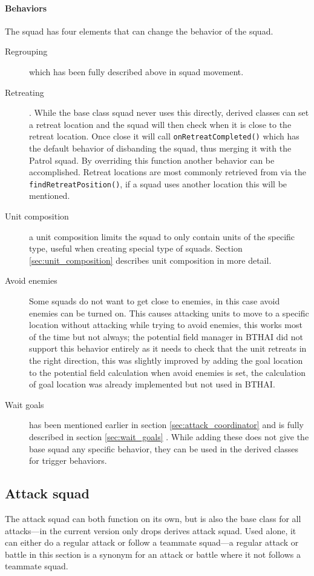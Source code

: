 \paragraph{Behaviors}
The squad has four elements that can change the behavior of the squad.
\begin{description}
	\item[Regrouping] which has been fully described above in squad movement.
	\item[Retreating]. While the base class squad never uses this directly, derived classes can set a retreat location and the squad will then check when it is close to the retreat location. Once close it will call \texttt{onRetreatCompleted()} which has the default behavior of disbanding the squad, thus merging it with the Patrol squad. By overriding this function another behavior can be accomplished. Retreat locations are most commonly retrieved from  via the \texttt{findRetreatPosition()}, if a squad uses another location this will be mentioned.
	\item[Unit composition] a unit composition limits the squad to only contain units of the specific type, useful when creating special type of squads. Section \ref{sec:unit_composition} describes unit composition in more detail.
	\item[Avoid enemies] Some squads do not want to get close to enemies, in this case avoid enemies can be turned on. This causes attacking units to move to a specific location without attacking while trying to avoid enemies, this works most of the time but not always; the potential field manager in BTHAI did not support this behavior entirely as it needs to check that the unit retreats in the right direction, this was slightly improved by adding the goal location to the potential field calculation when avoid enemies is set, the calculation of goal location was already implemented but not used in BTHAI.
	\item[Wait goals] has been mentioned earlier in section \ref{sec:attack_coordinator}  and is fully described in section \ref{sec:wait_goals} . While adding these does not give the base squad any specific behavior, they can be used in the derived classes for trigger behaviors.
\end{description}

\subsection{Attack squad}
\label{sec:attack_squad}
The attack squad can both function on its own, but is also the base class for all attacks—in the current version only drops derives attack squad. Used alone, it can either do a regular attack or follow a teammate squad—a regular attack or battle in this section is a synonym for an attack or battle where it not follows a teammate squad.

